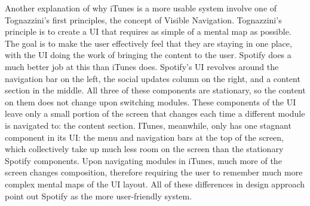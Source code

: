 \documentclass[12pt]{report}
\begin{document}
Another explanation of why iTunes is a more usable system involve 
one of Tognazzini's first principles, the concept of Visible 
Navigation. Tognazzini's principle is to create a UI that requires 
as simple of a mental map as possible. The goal is to make the 
user effectively feel that they are staying in one place, with the 
UI doing the work of bringing the content to the user. Spotify 
does a much better job at this than iTunes does. Spotify's UI 
revolves around the navigation bar on the left, the social updates 
column on the right, and a content section in the middle. All 
three of these components are stationary, so the content on them 
does not change upon switching modules. These components of the UI 
leave only a small portion of the screen that changes each time a 
different module is navigated to: the content section. ITunes, 
meanwhile, only has one stagnant component in its UI: the menu and 
navigation bars at the top of the screen, which collectively take 
up much less room on the screen than the stationary Spotify 
components. Upon navigating modules in iTunes, much more of the 
screen changes composition, therefore requiring the user to 
remember much more complex mental maps of the UI layout. All of 
these differences in design approach point out Spotify as the more 
user-friendly system.
\end{document}
